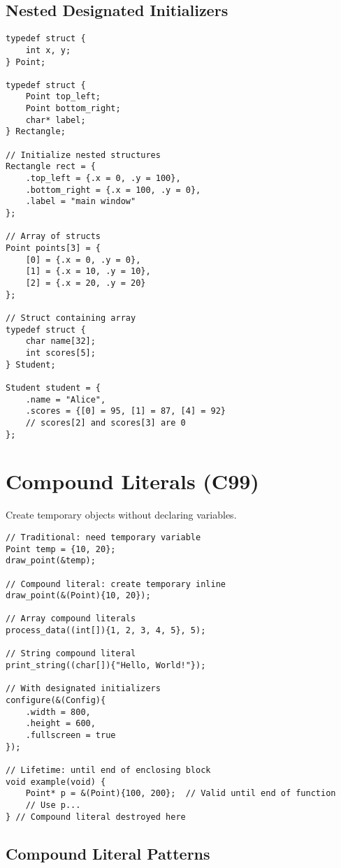 \subsection{Nested Designated Initializers}

\begin{lstlisting}
typedef struct {
    int x, y;
} Point;

typedef struct {
    Point top_left;
    Point bottom_right;
    char* label;
} Rectangle;

// Initialize nested structures
Rectangle rect = {
    .top_left = {.x = 0, .y = 100},
    .bottom_right = {.x = 100, .y = 0},
    .label = "main window"
};

// Array of structs
Point points[3] = {
    [0] = {.x = 0, .y = 0},
    [1] = {.x = 10, .y = 10},
    [2] = {.x = 20, .y = 20}
};

// Struct containing array
typedef struct {
    char name[32];
    int scores[5];
} Student;

Student student = {
    .name = "Alice",
    .scores = {[0] = 95, [1] = 87, [4] = 92}
    // scores[2] and scores[3] are 0
};
\end{lstlisting}

\section{Compound Literals (C99)}

Create temporary objects without declaring variables.

\begin{lstlisting}
// Traditional: need temporary variable
Point temp = {10, 20};
draw_point(&temp);

// Compound literal: create temporary inline
draw_point(&(Point){10, 20});

// Array compound literals
process_data((int[]){1, 2, 3, 4, 5}, 5);

// String compound literal
print_string((char[]){"Hello, World!"});

// With designated initializers
configure(&(Config){
    .width = 800,
    .height = 600,
    .fullscreen = true
});

// Lifetime: until end of enclosing block
void example(void) {
    Point* p = &(Point){100, 200};  // Valid until end of function
    // Use p...
} // Compound literal destroyed here
\end{lstlisting}

\subsection{Compound Literal Patterns}

